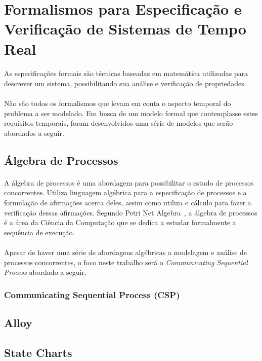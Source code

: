 \section{Formalismos para Especificação e Verificação de Sistemas de Tempo Real}
\paragraph{}
As especificações formais são técnicas baseadas em matemática utilizadas para descrever um sistema,
possibilitando sua análise e verificação de propriedades.
\paragraph{}
Não são todos os formalismos que levam em conta o aspecto temporal do problema a ser modelado.
Em busca de um modelo formal que contemplasse estes requisitos temporais, foram desenvolvidos uma série
de modelos que serão abordados a seguir.

\subsection{Álgebra de Processos}
\paragraph{}
A álgebra de processos é uma abordagem para possibilitar o estudo de processos concorrentes. Utiliza linguagem algébrica
para a especificação de processos e a formulação de afirmações acerca deles, assim como utiliza o cálculo para fazer a
verificação dessas afirmações. Segundo Petri Net Algebra~\cite{books/daglib/0003970}, a álgebra de processos é a área da
Ciência da Computação que se dedica a estudar formalmente a sequência de execução.
\paragraph{}
Apesar de haver uma série de abordagens algébricas a modelagem e análise de processos concorrentes, o foco neste trabalho
será o \textit{Communicating Sequential Process} abordado a seguir.

\subsubsection{Communicating Sequential Process (CSP)}
\paragraph{}


\subsection{Alloy}
\paragraph{}


\subsection{State Charts}
\paragraph{}

